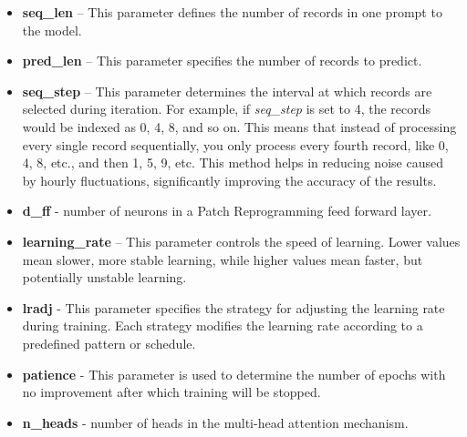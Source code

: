 \begin{itemize}
	\item \textbf{seq\_len} – This parameter defines the number of records in one prompt to the model.
	\item \textbf{pred\_len} – This parameter specifies the number of records to predict.
	\item \textbf{seq\_step} – This parameter determines the interval at which records are selected during iteration. For example, if \textit{seq\_step} is set to 4, the records would be indexed as 0, 4, 8, and so on. This means that instead of processing every single record sequentially, you only process every fourth record, like 0, 4, 8, etc., and then 1, 5, 9, etc. This method helps in reducing noise caused by hourly fluctuations, significantly improving the accuracy of the results.
	\item \textbf{d\_ff} - number of neurons in a Patch Reprogramming feed forward layer.
	\item \textbf{learning\_rate} – This parameter controls the speed of learning. Lower values mean slower, more stable learning, while higher values mean faster, but potentially unstable learning.
	\item \textbf{lradj} - This parameter specifies the strategy for adjusting the learning rate during training. Each strategy modifies the learning rate according to a predefined pattern or schedule.
	\item \textbf{patience} - This parameter is used to determine the number of epochs with no improvement after which training will be stopped.
	\item \textbf{n\_heads} - number of heads in the multi-head attention mechanism.
\end{itemize}

